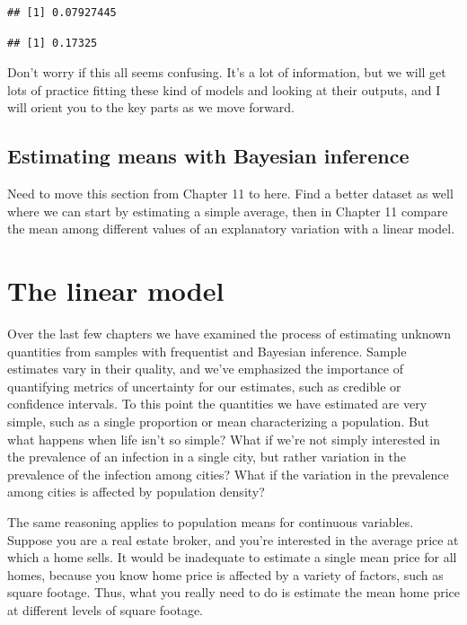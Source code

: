 \documentclass[
]{book}
\begin{document}
\begin{verbatim}
## [1] 0.07927445
\end{verbatim}

\begin{verbatim}
## [1] 0.17325
\end{verbatim}

Don't worry if this all seems confusing. It's a lot of information, but we will get lots of practice fitting these kind of models and looking at their outputs, and I will orient you to the key parts as we move forward.

\section{Estimating means with Bayesian inference}\label{estimating-means-with-bayesian-inference}

Need to move this section from Chapter 11 to here. Find a better dataset as well where we can start by estimating a simple average, then in Chapter 11 compare the mean among different values of an explanatory variation with a linear model.

\chapter{The linear model}\label{the-linear-model}

Over the last few chapters we have examined the process of estimating unknown quantities from samples with frequentist and Bayesian inference. Sample estimates vary in their quality, and we've emphasized the importance of quantifying metrics of uncertainty for our estimates, such as credible or confidence intervals. To this point the quantities we have estimated are very simple, such as a single proportion or mean characterizing a population. But what happens when life isn't so simple? What if we're not simply interested in the prevalence of an infection in a single city, but rather variation in the prevalence of the infection among cities? What if the variation in the prevalence among cities is affected by population density?

The same reasoning applies to population means for continuous variables. Suppose you are a real estate broker, and you're interested in the average price at which a home sells. It would be inadequate to estimate a single mean price for all homes, because you know home price is affected by a variety of factors, such as square footage. Thus, what you really need to do is estimate the mean home price at different levels of square footage.
\end{document}

